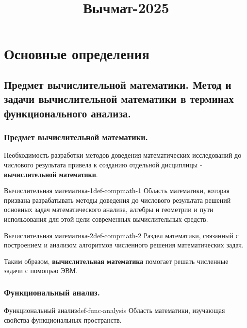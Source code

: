 \documentclass[14pt]{extarticle}
\title{Вычмат-2025}
\begin{document}
\maketitle
\tableofcontents

\section{Основные определения}

\subsection{Предмет вычислительной математики. Метод и задачи вычислительной математики в терминах функционального анализа.}

    \subsubsection{Предмет вычислительной математики.}

        Необходимость разработки методов доведения математических исследований до числового результата привела к созданию отдельной дисциплицы - \textbf{вычислительной математики}.

        \begin{definition}{Вычислительная математика-1}{def-compmath-1}
            Область математики, которая призвана разрабатывать методы доведения до числового результата решений основных задач математического анализа, алгебры и геометрии и пути использования для этой цели современных вычислительных средств.
        \end{definition}

        \begin{definition}{Вычислительная математика-2}{def-compmath-2}
            Раздел математики, связанный с построением и анализом алгоритмов численного решения математических задач.
        \end{definition}

        Таким образом, \textbf{вычислительная математика} помогает решать численные задачи с помощью ЭВМ.

    \subsubsection{Функциональный анализ.}
        \begin{definition}{Функциональный анализ}{def-func-analysis}
            Область математики, изучающая свойства функциональных пространств.
        \end{definition}
\end{document}
